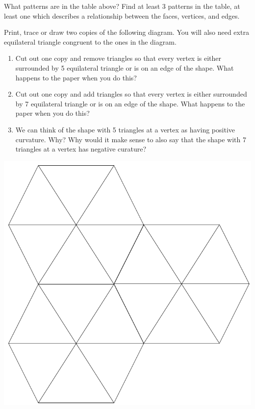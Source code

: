 \documentclass[newpage,hints,handout]{ximera}
\begin{document}
\begin{problem}
What patterns are in the table above?  Find at least 3 patterns in the table, at least one which describes a relationship between the faces, vertices, and edges.
\end{problem}

\begin{problem}
 Print, trace or draw two copies of the following diagram. You will also need extra equilateral triangle congruent to the ones in the diagram. 
 
\begin{enumerate}
 \item  Cut out one copy and remove triangles so that every vertex is either surrounded by 5 equilateral triangle or is on an edge of the shape. What happens to the paper when you do this?
 \item Cut out one copy and add triangles so that every vertex is either surrounded by 7 equilateral triangle or is on an edge of the shape. What happens to the paper when you do this?
 \item We can think of the shape with 5 triangles at a vertex as having positive curvature. Why? Why would it make sense to also say that the shape with 7 triangles at a vertex has negative curature?
\end{enumerate}
\begin{image}
 \includegraphics[width=1.5\textwidth]{Hexagons.png}
\end{image}
\end{problem}
\end{document}
